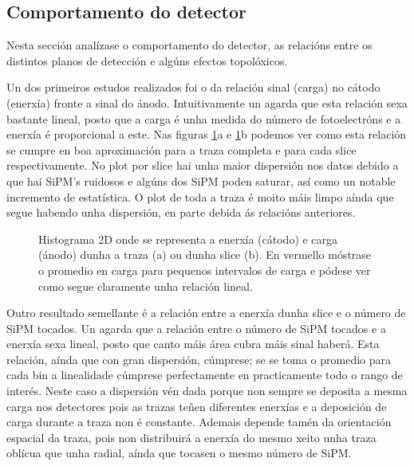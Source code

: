\documentclass[a4paper,12pt]{article}
\begin{document}
\subsection{Comportamento do detector}\label{comportamento}

Nesta sección analízase o comportamento do detector, as relacións entre os distintos planos de detección e algúns efectos topolóxicos.

Un dos primeiros estudos realizados foi o da relación sinal (carga) no cátodo (enerxía) fronte a sinal do ánodo. Intuitivamente un agarda que esta relación sexa bastante lineal, posto que a carga é unha medida do número de fotoelectróns e a enerxía é proporcional a este. Nas figuras \ref{EQ}a e \ref{EQ}b podemos ver como esta relación se cumpre en boa aproximación para a traza completa e para cada slice respectivamente.  No plot por slice hai unha maior dispersión nos datos debido a que hai SiPM's ruidosos e algúns dos SiPM poden saturar, así como un notable incremento de estatística. O plot de toda a traza é moito máis limpo aínda que segue habendo unha dispersión, en parte debida ás relacións anteriores.

\begin{figure}[!]
\centering
{}
\caption{Histograma 2D onde se representa a enerxía (cátodo) e carga (ánodo) dunha a traza (a) ou dunha slice (b). En vermello móstrase o promedio en carga para pequenos intervalos de carga e pódese ver como segue claramente unha relación lineal.}
\label{EQ}
\end{figure}

Outro resultado semellante é a relación entre a enerxía dunha slice e o número de SiPM tocados. Un agarda que a relación entre o número de SiPM tocados e a enerxía sexa lineal, posto que canto máis área cubra máis sinal haberá. Esta relación, aínda que con gran dispersión, cúmprese; se se toma o promedio para cada bin a linealidade cúmprese perfectamente en practicamente todo o rango de interés. Neste caso a dispersión vén dada porque non sempre se deposita a mesma carga nos detectores pois as trazas teñen diferentes enerxías e a deposición de carga durante a traza non é constante. Ademais depende tamén da orientación espacial da traza, pois non distribuirá a enerxía do mesmo xeito unha traza oblícua que unha radial, aínda que tocasen o mesmo número de SiPM.
\end{document}
